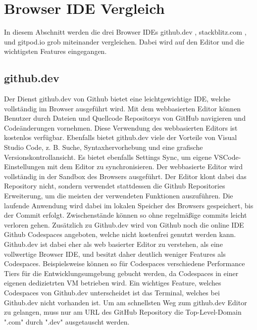 \section{Browser IDE Vergleich}
In diesem Abschnitt werden die drei Browser IDEs
github.dev \cite{githubDevWebsite},
stackblitz.com \cite{stackblitzcomWebsite},
und
gitpod.io \cite{gitpodioWebsite}
grob miteinander vergleichen.
Dabei wird auf den Editor und die wichtigsten Features eingegangen.

\subsection{github.dev}
Der Dienst github.dev von Github bietet eine leichtgewichtige IDE, welche vollständig im Browser ausgeführt wird. Mit dem webbasierten Editor können Benutzer durch Dateien und Quellcode Repositorys von GitHub navigieren  und Codeänderungen vornehmen. Diese Verwendung des webbasierten Editors ist kostenlos verfügbar.
Ebenfalls bietet github.dev viele der Vorteile von Visual Studio Code, z. B. Suche, Syntaxhervorhebung und eine grafische Versionskontrollansicht. Es bietet ebenfalls Settings Sync, um eigene VSCode-Einstellungen mit dem Editor zu synchronisieren.
Der webbasierte Editor wird vollständig in der Sandbox des Browsers ausgeführt. Der Editor klont dabei das Repository nicht, sondern verwendet stattdessen die Github Repositories Erweiterung, um die meisten der verwendeten Funktionen auszuführen. Die laufende Anwendung wird dabei im lokalen Speicher des Browsers gespeichert, bis der Commit erfolgt. Zwischenstände können so ohne regelmäßige commits leicht verloren gehen.
Zusätzlich zu Github.dev wird von Github noch die online IDE Github Codespaces angeboten, welche nicht kostenfrei genutzt werden kann. Github.dev ist dabei eher als web basierter Editor zu verstehen, als eine vollwertige Browser IDE, und besitzt daher deutlich weniger Features als Codespaces. Beispielsweise können so für Codespaces verschiedene Performance Tiers für die Entwicklungsumgebung gebucht werden, da Codespaces in einer eigenen dedizietrten VM betrieben wird. Ein wichtiges Feature, welches Codespaces von Github.dev unterscheidet ist das Terminal, welches bei Github.dev nicht vorhanden ist. 
Um am schnellsten Weg zum github.dev Editor zu gelangen,
muss nur am URL des GitHub Repository die Top-Level-Domain ".com"
durch ".dev" ausgetauscht werden.

